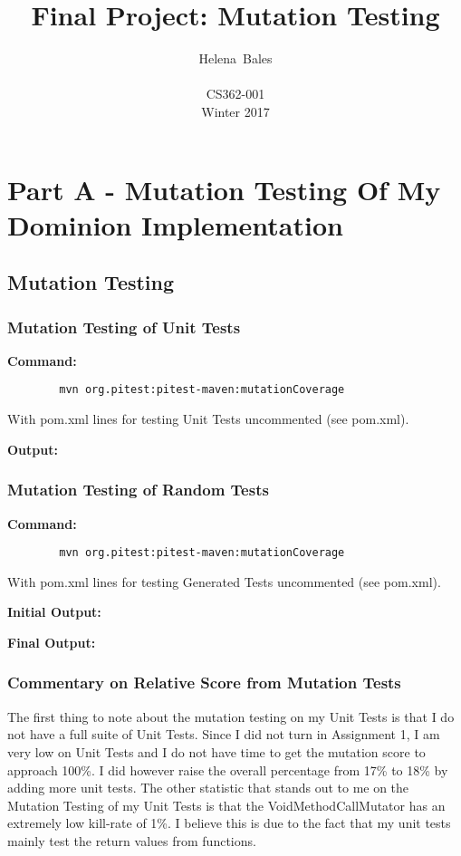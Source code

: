 \documentclass[letterpaper,10pt]{article}
\title{Final Project: Mutation Testing}
\author{Helena~Bales\\ \\ CS362-001 \\ Winter 2017}
\begin{document}
\maketitle

\clearpage
\tableofcontents
\clearpage

\section{Part A - Mutation Testing Of My Dominion Implementation}
	\subsection{Mutation Testing}
		\subsubsection{Mutation Testing of Unit Tests}
		\textbf{Command:} \\ 
		\begin{lstlisting}
		mvn org.pitest:pitest-maven:mutationCoverage 
		\end{lstlisting}

		With pom.xml lines for testing Unit Tests uncommented (see pom.xml).

		\textbf{Output:}\\
		

		\subsubsection{Mutation Testing of Random Tests}
		\textbf{Command: }
		\begin{lstlisting}
		mvn org.pitest:pitest-maven:mutationCoverage 
		\end{lstlisting}

		With pom.xml lines for testing Generated Tests uncommented (see pom.xml).

		\textbf{Initial Output: }
		

		\textbf{Final Output: }
		

		\subsubsection{Commentary on Relative Score from Mutation Tests}
		The first thing to note about the mutation testing on my Unit Tests is that I do not 
		have a full suite of Unit Tests. Since I did not turn in Assignment 1, I am very low 
		on Unit Tests and I do not have time to get the mutation score to approach 100\%. I 
		did however raise the overall percentage from 17\% to 18\% by adding more unit tests. 
		The other statistic that stands out to me on the Mutation Testing of my Unit Tests is 
		that the VoidMethodCallMutator has an extremely low kill-rate of 1\%. I believe this 
		is due to the fact that my unit tests mainly test the return values from functions.
\end{document}
